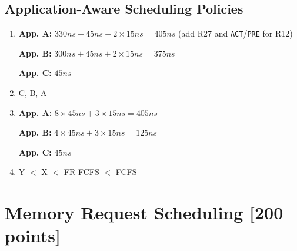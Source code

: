 \documentclass[a4paper]{article}
\begin{document}
\subsection{Application-Aware Scheduling Policies}

\begin{enumerate}[label=\alph*)]
    \item
        \textbf{App. A:} $330ns + 45ns + 2 \times 15ns = 405ns$ (add R27 and \verb|ACT|/\verb|PRE| for R12)

        \textbf{App. B:} $300ns + 45ns + 2 \times 15ns = 375ns$

        \textbf{App. C:} $45ns$
    \item C, B, A
    \item
        \textbf{App. A:} $8 \times 45ns + 3 \times 15ns = 405ns$

        \textbf{App. B:} $4 \times 45ns + 3 \times 15ns = 125ns$

        \textbf{App. C:} $45ns$

    \item Y $<$ X $<$ FR-FCFS $<$ FCFS
\end{enumerate}

\section{Memory Request Scheduling [200 points]}
\end{document}
